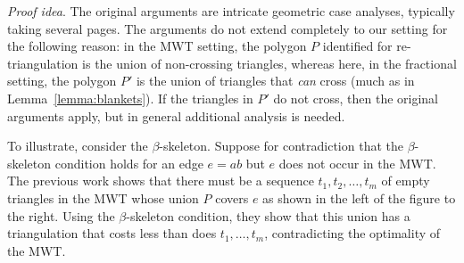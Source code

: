 \documentclass[final]{siamltex}
\renewcommand{\overline}[1]{{#1}}
\newcommand{\edge}{e}
\newcommand{\polygon}{P}
\newcommand{\tri}{t}  \newcommand{\vertex}{v}
\newenvironment{proofidea}{\par{\it Proof idea}. \ignorespaces}{}
\begin{document}
\begin{proofidea}
  The original arguments are intricate geometric case analyses, typically taking several
  pages.  The arguments do not extend completely to our setting for the following reason:
  in the MWT setting, the polygon $\polygon$ identified for re-triangulation 
  is the union of non-crossing triangles,
  whereas here, in the fractional setting, 
  the polygon $\polygon'$ is the union of triangles that {\em can} cross
  (much as in Lemma~\ref{lemma:blankets}).
  If the triangles in $\polygon'$ do not cross, then the original arguments apply,
  but in general additional analysis is needed.
    To illustrate, consider the $\beta$-skeleton.
    Suppose for contradiction that the $\beta$-skeleton condition
    holds for an edge $\edge=\overline{a b}$ but $e$ does not occur in the MWT.
    The previous work \cite{keil1994computing,cheng1996approaching} 
    shows that there must be
    a sequence $\tri_1,\tri_2,\ldots,\tri_m$ of empty triangles in the MWT whose union $\polygon$
    covers $\edge$ as shown in the left of the figure to the right.
    Using the $\beta$-skeleton condition, they show that this union 
    has a triangulation that costs less than does $\tri_1,\ldots,\tri_m$, 
    contradicting the optimality of the MWT.


\end{window}
\end{proofidea}
\end{document}
